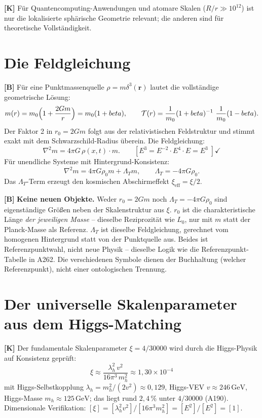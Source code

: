 \textbf{[K]} Für Quantencomputing-Anwendungen und atomare Skalen
($R/r\gg10^{12}$) ist nur die lokalisierte sphärische Geometrie relevant; die
anderen sind für theoretische Vollständigkeit.

\section{Die Feldgleichung}

\textbf{[B]} Für eine Punktmassenquelle $\rho=m\delta^3(\mathbf r)$ lautet die
vollständige geometrische Lösung:
\[
  m(r) = m_0\Bigl(1+\frac{2Gm}{r}\Bigr) = m_0(1+\beta),
  \qquad
  \mathcal T(r) = \frac{1}{m_0}(1+\beta)^{-1}\approx\frac{1}{m_0}(1-\beta).
\]
Der Faktor 2 in $r_0=2Gm$ folgt aus der relativistischen Feldstruktur und stimmt
exakt mit dem Schwarzschild-Radius überein. Die Feldgleichung:
\[
  \nabla^2 m = 4\pi G\,\rho(x,t)\cdot m.
  \qquad [E^3 = E^{-2}\cdot E^4\cdot E = E^3\;]\checkmark
\]
Für unendliche Systeme mit Hintergrund-Konsistenz:
\[
  \nabla^2 m = 4\pi G\rho_0 m + \Lambda_T m,
  \qquad \Lambda_T = -4\pi G\rho_0.
\]
Das $\Lambda_T$-Term erzeugt den kosmischen Abschirmeffekt $\xi_\text{eff}=\xi/2$.

\textbf{[B]} \textbf{Keine neuen Objekte.} Weder $r_0=2Gm$ noch
$\Lambda_T=-4\pi G\rho_0$ sind eigenständige Größen neben der Skalenstruktur
aus $\xi$. $r_0$ ist die charakteristische Länge \emph{der jeweiligen Masse} --
dieselbe Reziprozität wie $L_0$, nur mit $m$ statt der Planck-Masse als
Referenz. $\Lambda_T$ ist dieselbe Feldgleichung, gerechnet vom homogenen
Hintergrund statt von der Punktquelle aus. Beides ist Referenzpunktwahl,
nicht neue Physik -- dieselbe Logik wie die Referenzpunkt-Tabelle in A262.
Die verschiedenen Symbole dienen der Buchhaltung (welcher Referenzpunkt),
nicht einer ontologischen Trennung.

\section{Der universelle Skalenparameter aus dem Higgs-Matching}

\textbf{[K]} Der fundamentale Skalenparameter $\xi = 4/30000$ wird durch die Higgs-Physik
auf Konsistenz geprüft:
\[
  \boxed{\;\xi \approx \frac{\lambda_h^2\,v^2}{16\pi^3\,m_h^2}
  \approx 1{,}30\times10^{-4}\;}
\]
mit Higgs-Selbstkopplung $\lambda_h = m_h^2/(2v^2)\approx0{,}129$, Higgs-VEV $v\approx246\,\text{GeV}$,
Higgs-Masse $m_h\approx125\,\text{GeV}$; das liegt rund $2{,}4\,\%$ unter $4/30000$ (A190). Dimensionale Verifikation:
$[\xi]=[\lambda_h^2 v^2]/[16\pi^3 m_h^2]=[E^2]/[E^2]=[1]$.

